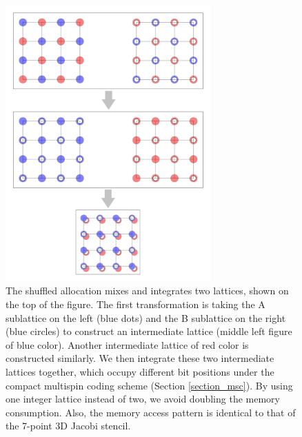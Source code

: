 \begin{figure}[!h]
  \centering
  \includegraphics[width=0.7\textwidth] {img/check_2_shuffled_.pdf}

  \caption{The shuffled allocation mixes and integrates two lattices,
shown on the top of the figure. The first transformation is taking
the A sublattice on the left (blue dots) and the B sublattice
on the right (blue circles) to construct an intermediate lattice
(middle left figure of blue color).
Another intermediate lattice of red color is constructed similarly.
We then integrate these two intermediate lattices together, which
occupy different bit positions under the compact multispin coding scheme (Section \ref{section_msc}).
By using one integer lattice instead of two, we avoid doubling the memory consumption.
Also, the memory access pattern is identical to that of the 7-point 3D Jacobi stencil.
}



\label{fig_alloc3}
\end{figure}


